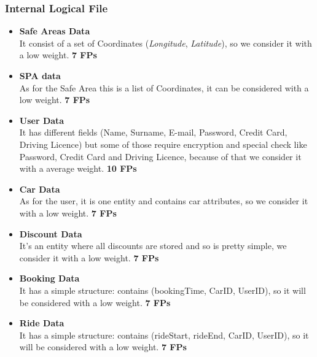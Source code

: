 \subsubsection{Internal Logical File}
\begin{itemize}
    \item \textbf{Safe Areas Data}\\
    It consist of a set of Coordinates (\textit{Longitude}, \textit{Latitude}), so we consider it with a low weight.
    \hfill
    \textbf{7 FPs}
    
    \item \textbf{SPA data}\\
    As for the Safe Area this is a list of Coordinates, it can be considered with a low weight.
    \hfill
    \textbf{7 FPs}
    
    \item \textbf{User Data}\\
    It has different fields (Name, Surname, E-mail, Password, Credit Card, Driving Licence) but some of those require encryption and special check like Password, Credit Card and Driving Licence, because of that we consider it with a average weight.
    \hfill
    \textbf{10 FPs}
    
    \item \textbf{Car Data}\\
    As for the user, it is one entity and contains car attributes, so we consider it with a low weight.
    \hfill
    \textbf{7 FPs}
    
    \item \textbf{Discount Data}\\
    It's an entity where all discounts are stored and so is pretty simple, we consider it with a low weight.
    \hfill
    \textbf{7 FPs}
    
    \item \textbf{Booking Data}\\
    It has a simple structure: contains (bookingTime, CarID, UserID), so it will be considered with a low weight.
    \hfill
    \textbf{7 FPs}
    
    \item \textbf{Ride Data}\\
    It has a simple structure: contains (rideStart, rideEnd, CarID, UserID), so it will be considered with a low weight.
    \hfill
    \textbf{7 FPs}
\end{itemize}


